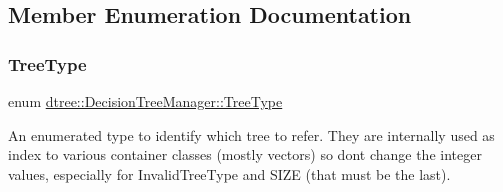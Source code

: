 \subsection{Member Enumeration Documentation}
\mbox{\label{classdtree_1_1_decision_tree_manager_a14180eb59d2c245ce3af1c27ddb0846d}} 
\subsubsection{\texorpdfstring{TreeType}{TreeType}}
{\footnotesize\ttfamily enum \mbox{\hyperlink{classdtree_1_1_decision_tree_manager_a14180eb59d2c245ce3af1c27ddb0846d}{dtree\+::\+Decision\+Tree\+Manager\+::\+Tree\+Type}}}



An enumerated type to identify which tree to refer. They are internally used as index to various container classes (mostly vectors) so don\textquotesingle{}t change the integer values, especially for Invalid\+Tree\+Type and S\+I\+ZE (that must be the last). 

